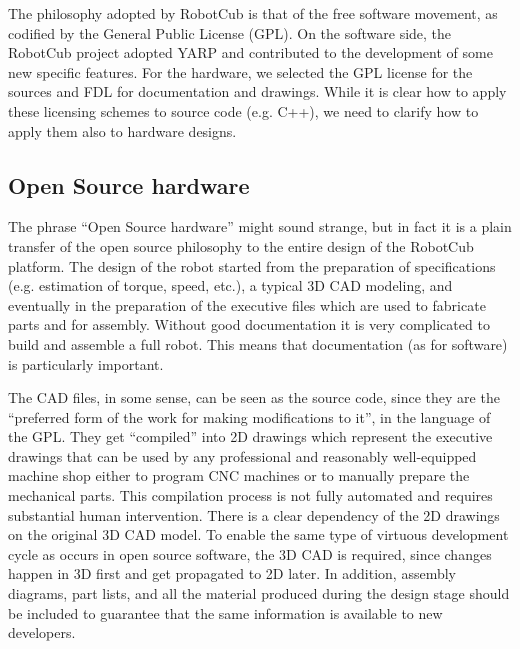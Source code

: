 The philosophy adopted by RobotCub is that of
the free software movement,
as codified by the General Public License (GPL). 
On the software side, the RobotCub project adopted YARP and contributed
to the development of some new specific features. For the hardware, we
selected the GPL license for the sources and FDL for documentation
and drawings. While it is clear how to apply these licensing
schemes to source code (e.g. C++), we need to clarify how to
apply them also to hardware designs.

\subsection{Open Source hardware}
The phrase ``Open Source hardware'' might sound strange,
 but in fact it is a 
plain transfer of the open source philosophy to the entire
design of the RobotCub platform.
%
%
The design of the robot started from 
the preparation of specifications (e.g. estimation of torque, speed, etc.),
a typical 3D CAD modeling, and eventually in the preparation
of the executive files which are used to fabricate parts and for assembly. 
Without good documentation it is very complicated to build and assemble 
a full robot. This means that documentation (as for software) is particularly 
important.

The CAD files, in some sense, can be seen as the source code, since
they are the ``preferred form of the work for making modifications
to it'', in the language of the GPL.
%
They get ``compiled''
into 2D drawings which represent the executive drawings that can be used by any
professional and reasonably well-equipped machine shop either to program CNC machines 
or to manually prepare the mechanical parts. This compilation process is not fully 
automated and requires substantial human intervention. There is a clear dependency 
of the 2D drawings on the original 3D CAD model. To enable the same type of virtuous 
development cycle as occurs in open source software, the 3D CAD is required, since changes happen 
in 3D first and get propagated to 2D later. In addition, assembly diagrams, part 
lists, and all the material produced during the design stage should be included 
to guarantee that the same information is available to new developers.


